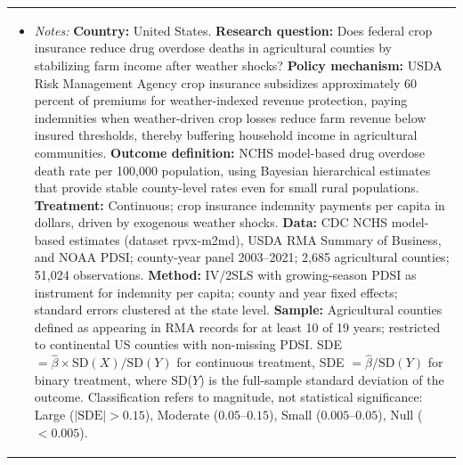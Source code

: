 \begin{table}[t]
\begin{tabular}{lcccccc}
\multicolumn{7}{p{0.95\textwidth}}{\footnotesize \begin{itemize}[leftmargin=*] \item \textit{Notes:} \textbf{Country:} United States. \textbf{Research question:} Does federal crop insurance reduce drug overdose deaths in agricultural counties by stabilizing farm income after weather shocks? \textbf{Policy mechanism:} USDA Risk Management Agency crop insurance subsidizes approximately 60 percent of premiums for weather-indexed revenue protection, paying indemnities when weather-driven crop losses reduce farm revenue below insured thresholds, thereby buffering household income in agricultural communities. \textbf{Outcome definition:} NCHS model-based drug overdose death rate per 100,000 population, using Bayesian hierarchical estimates that provide stable county-level rates even for small rural populations. \textbf{Treatment:} Continuous; crop insurance indemnity payments per capita in dollars, driven by exogenous weather shocks. \textbf{Data:} CDC NCHS model-based estimates (dataset rpvx-m2md), USDA RMA Summary of Business, and NOAA PDSI; county-year panel 2003--2021; 2,685 agricultural counties; 51,024 observations. \textbf{Method:} IV/2SLS with growing-season PDSI as instrument for indemnity per capita; county and year fixed effects; standard errors clustered at the state level. \textbf{Sample:} Agricultural counties defined as appearing in RMA records for at least 10 of 19 years; restricted to continental US counties with non-missing PDSI. SDE $= \hat{\beta} \times \text{SD}(X) / \text{SD}(Y)$ for continuous treatment, SDE $= \hat{\beta} / \text{SD}(Y)$ for binary treatment, where SD($Y$) is the full-sample standard deviation of the outcome. Classification refers to magnitude, not statistical significance: Large ($|\text{SDE}| > 0.15$), Moderate ($0.05$--$0.15$), Small ($0.005$--$0.05$), Null ($< 0.005$). \end{itemize}}
\end{tabular}
\end{table}
